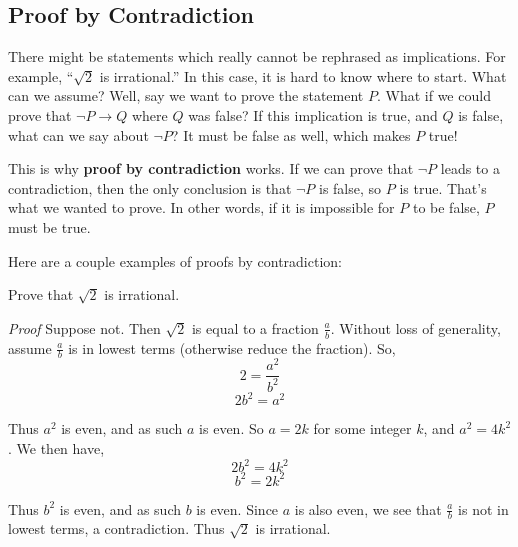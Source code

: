 \documentclass[11pt,]{book}
\makeatletter
\newcommand{\terminology}[1]{\textbf{#1}}
\theoremstyle{ptxplainnotitle}
\theoremstyle{ptxplaintitle}
\renewcommand*{\proofname}{Proof}
\renewenvironment{proof}[1][\proofname]{\par
  \pushQED{\qed}%
  \normalfont \topsep6\p@\@plus6\p@\relax
  \trivlist
  \item\relax
    {\itshape
    #1\@addpunct{.}}\hspace\labelsep\ignorespaces
}{%
  \popQED\endtrivlist\@endpefalse
}
\theoremstyle{ptxdefinitionnotitle}
\theoremstyle{ptxdefinitiontitle}
\theoremstyle{ptxdefinitionnotitle}
\theoremstyle{ptxdefinitiontitle}
\theoremstyle{ptxdefinitionnotitle}
\theoremstyle{ptxdefinitiontitle}
\theoremstyle{ptxdefinitiontitlenonumber}
\theoremstyle{ptxdefinitiontitlenonumber}
\numberwithin{equation}{chapter}
\newcommand{\imp}{\rightarrow}
\makeatother
\begin{document}
\subsection[{Proof by Contradiction}]{Proof by Contradiction}\label{subsection-24}
\hypertarget{p-2333}{}%
%
\par
\hypertarget{p-2334}{}%
There might be statements which really cannot be rephrased as implications. For example, ``\(\sqrt 2\) is irrational.'' In this case, it is hard to know where to start. What can we assume? Well, say we want to prove the statement \(P\). What if we could prove that \(\neg P \imp Q\) where \(Q\) was false? If this implication is true, and \(Q\) is false, what can we say about \(\neg P\)? It must be false as well, which makes \(P\) true!%
\par
\hypertarget{p-2335}{}%
This is why \terminology{proof by contradiction} works. If we can prove that \(\neg P\) leads to a contradiction, then the only conclusion is that \(\neg P\) is false, so \(P\) is true. That's what we wanted to prove. In other words, if it is impossible for \(P\) to be false, \(P\) must be true.%
\par
\hypertarget{p-2336}{}%
Here are a couple examples of proofs by contradiction:%
\begin{example}\label{example-68}
\hypertarget{p-2337}{}%
Prove that \(\sqrt{2}\) is irrational.%
\par\smallskip%
\noindent\textbf{}\hypertarget{solution-255}{}\begin{proof}\hypertarget{proof-27}{}
\hypertarget{p-2338}{}%
Suppose not. Then \(\sqrt 2\) is equal to a fraction \(\frac{a}{b}\). Without loss of generality, assume \(\frac{a}{b}\) is in lowest terms (otherwise reduce the fraction). So,%
\begin{equation*}
2 = \frac{a^2}{b^2}
\end{equation*}
%
\begin{equation*}
2b^2 = a^2
\end{equation*}
%
\par
\hypertarget{p-2339}{}%
Thus \(a^2\) is even, and as such \(a\) is even. So \(a = 2k\) for some integer \(k\), and \(a^2 = 4k^2\). We then have,%
\begin{equation*}
2b^2 = 4k^2
\end{equation*}
%
\begin{equation*}
b^2 = 2k^2
\end{equation*}
%
\par
\hypertarget{p-2340}{}%
Thus \(b^2\) is even, and as such \(b\) is even. Since \(a\) is also even, we see that \(\frac{a}{b}\) is not in lowest terms, a contradiction. Thus \(\sqrt 2\) is irrational.%
\end{proof}
\end{example}
\end{document}
